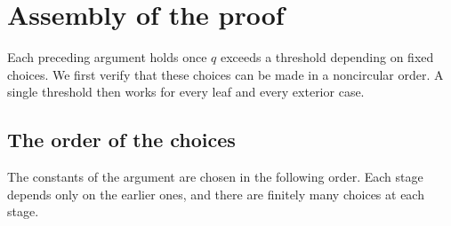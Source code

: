 \section{Assembly of the proof}\label{sec:join}

Each preceding argument holds once $q$ exceeds a threshold depending on fixed choices.
We first verify that these choices can be made in a noncircular order. A single
threshold then works for every leaf and every exterior case.

\subsection{The order of the choices}\label{subsec:order}
The constants of the argument are chosen in the following order. Each stage depends only on the
earlier ones, and there are finitely many choices at each stage.
